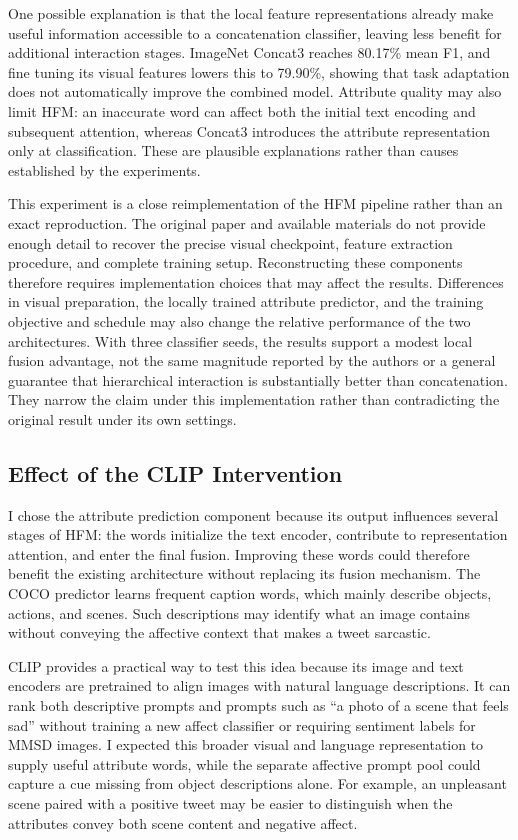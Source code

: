 \documentclass[conference]{IEEEtran}
\begin{document}
One possible explanation is that the local feature representations already make useful information accessible to a concatenation classifier, leaving less benefit for additional interaction stages. ImageNet Concat3 reaches 80.17\% mean F1, and fine tuning its visual features lowers this to 79.90\%, showing that task adaptation does not automatically improve the combined model. Attribute quality may also limit HFM: an inaccurate word can affect both the initial text encoding and subsequent attention, whereas Concat3 introduces the attribute representation only at classification. These are plausible explanations rather than causes established by the experiments.

This experiment is a close reimplementation of the HFM pipeline rather than an exact reproduction. The original paper and available materials do not provide enough detail to recover the precise visual checkpoint, feature extraction procedure, and complete training setup. Reconstructing these components therefore requires implementation choices that may affect the results. Differences in visual preparation, the locally trained attribute predictor, and the training objective and schedule may also change the relative performance of the two architectures. With three classifier seeds, the results support a modest local fusion advantage, not the same magnitude reported by the authors or a general guarantee that hierarchical interaction is substantially better than concatenation. They narrow the claim under this implementation rather than contradicting the original result under its own settings.

\subsection{Effect of the CLIP Intervention}
I chose the attribute prediction component because its output influences several stages of HFM: the words initialize the text encoder, contribute to representation attention, and enter the final fusion. Improving these words could therefore benefit the existing architecture without replacing its fusion mechanism. The COCO predictor learns frequent caption words, which mainly describe objects, actions, and scenes. Such descriptions may identify what an image contains without conveying the affective context that makes a tweet sarcastic.

CLIP provides a practical way to test this idea because its image and text encoders are pretrained to align images with natural language descriptions. It can rank both descriptive prompts and prompts such as ``a photo of a scene that feels sad'' without training a new affect classifier or requiring sentiment labels for MMSD images. I expected this broader visual and language representation to supply useful attribute words, while the separate affective prompt pool could capture a cue missing from object descriptions alone. For example, an unpleasant scene paired with a positive tweet may be easier to distinguish when the attributes convey both scene content and negative affect.
\end{document}
